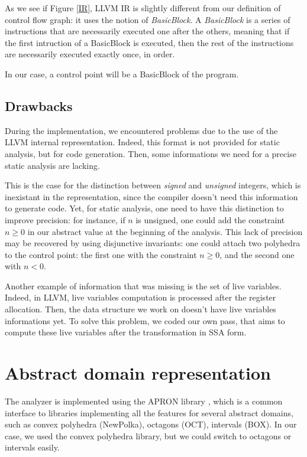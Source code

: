 \documentclass[a4paper,english,titlepage,11pt]{article}
\begin{document}
As we see if Figure \ref{IR}, LLVM IR is slightly different from
our definition of control flow graph: it uses the notion of \emph{BasicBlock}.
A \emph{BasicBlock} is a series of instructions that are necessarily executed
one after the others, meaning that if the first intruction of a BasicBlock is
executed, then the rest of the instructions are necessarily executed exactly
once, in order.

In our case, a control point will be a BasicBlock of the program.

\subsection{Drawbacks}

During the implementation, we encountered problems due to the use of the LLVM
internal representation. Indeed, this format is not provided for static
analysis, but for code generation. Then, some informations we need for a precise
static analysis are lacking.

This is the case for the distinction between \emph{signed} and \emph{unsigned}
integers, which is inexistant in the representation, since the compiler doesn't
need this information to generate code. Yet, for static analysis, one need to
have this distinction to improve precision:
for instance, if $n$ is unsigned, one could add the constraint $n \geq 0$ in our
	abstract value at the beginning of the analysis.
	This lack of precision may be recovered by using disjunctive invariants: one
	could attach two polyhedra to the control point: the first one with the
	constraint $n \geq 0$, and the second one with $n < 0$.


Another example of information that was missing is the set of live variables.
Indeed, in LLVM, live variables computation is processed after the register
allocation. Then, the data structure we work on doesn't have live variables
informations yet. To solve this problem, we coded our own pass, that aims to
compute these live variables after the transformation in SSA form.

 \section{Abstract domain representation}

	The analyzer is implemented using the APRON library \cite{JM09}, which
	is a common interface to libraries implementing all the features
	for several abstract domains, such as convex polyhedra (NewPolka), 
	octagons (OCT), intervals (BOX).
	In our case, we used the convex polyhedra library, but we could switch
	to octagons or intervals easily.
\end{document}
